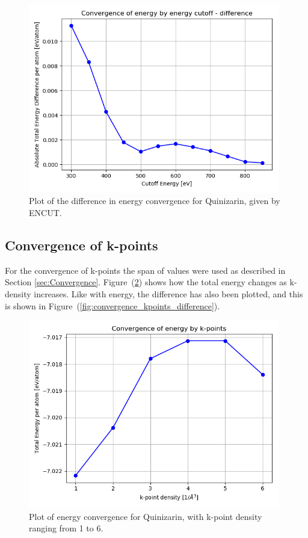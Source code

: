 \documentclass{article}
\begin{document}
    \begin{figure}[H]
      \centering
      \includegraphics[width = 11cm]{../fig/convergence_energy_difference.png}
      \caption{Plot of the difference in energy convergence for Quinizarin, given by ENCUT. }
      \label{fig:convergence_energy_difference}
    \end{figure}

    \vspace{1cm}

  \subsection{Convergence of k-points}

    For the convergence of k-points the span of values were used as described in Section \ref{sec:Convergence}. Figure~(\ref{fig:convergence_kpoints}) shows how the total energy changes as k-density increases. Like with energy, the difference has also been plotted, and this is shown in Figure~(\ref{fig:convergence_kpoints_difference}).

    \begin{figure}[H]
        \centering
        \includegraphics[width = 11cm]{../fig/convergence_kpoints.png}
        \caption{Plot of energy convergence for Quinizarin, with k-point density ranging from 1 to 6. }
        \label{fig:convergence_kpoints}
    \end{figure}
\end{document}
